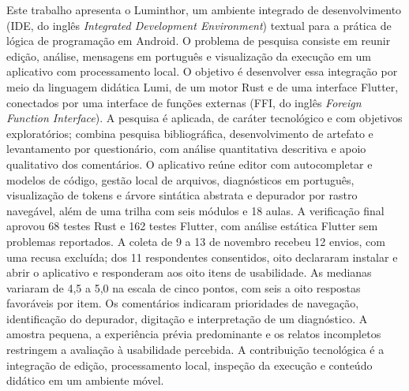 \documentclass[
    12pt
    ,oneside
    ,a4paper
    ,chapter=TITLE
    ,section=TITLE
    ,sumario=abnt-6027-2012]{abntex2}
\begin{document}



\imprimircapa
\imprimirfolhaderosto{}

\begin{resumo}
Este trabalho apresenta o Luminthor, um ambiente integrado de desenvolvimento
(IDE, do inglês \textit{Integrated Development Environment}) textual para a
prática de lógica de programação em Android. O problema de pesquisa consiste
em reunir edição, análise, mensagens em português e visualização da execução
em um aplicativo com processamento local. O objetivo é desenvolver essa
integração por meio da linguagem didática Lumi, de um motor Rust e de uma
interface Flutter, conectados por uma interface de funções externas
(FFI, do inglês \textit{Foreign Function Interface}). A pesquisa é aplicada,
de caráter tecnológico e com objetivos exploratórios; combina pesquisa
bibliográfica, desenvolvimento de artefato e levantamento por questionário,
com análise quantitativa descritiva e apoio qualitativo dos comentários.
O aplicativo reúne editor com autocompletar e modelos de código, gestão local
de arquivos, diagnósticos em português, visualização de tokens e árvore
sintática abstrata e depurador por rastro navegável, além de uma trilha com
seis módulos e 18 aulas. A verificação final aprovou 68 testes Rust e
162 testes Flutter, com análise estática Flutter sem problemas reportados. A coleta de 9 a 13 de novembro recebeu 12 envios, com uma recusa
excluída; dos 11 respondentes consentidos, oito declararam instalar e abrir o
aplicativo e responderam aos oito itens de usabilidade. As medianas variaram
de 4,5 a 5,0 na escala de cinco pontos, com seis a oito respostas favoráveis
por item. Os comentários indicaram prioridades de navegação, identificação do
depurador, digitação e interpretação de um diagnóstico. A amostra pequena,
a experiência prévia predominante e os relatos incompletos restringem a avaliação à usabilidade percebida. A contribuição tecnológica é a integração de edição, processamento
local, inspeção da execução e conteúdo didático em um ambiente móvel.

\end{resumo}
\end{document}
